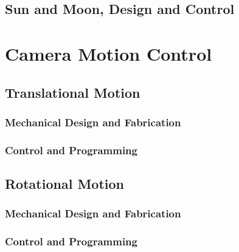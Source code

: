 \documentclass[]{report}
\begin{document}
	\chapter{Sun and Moon, Design and Control}

\part{Camera Motion Control}
	
	\chapter{Translational Motion}
		\section{Mechanical Design and Fabrication}
		\section{Control and Programming}
		
	\chapter{Rotational Motion}
		\section{Mechanical Design and Fabrication}
		\section{Control and Programming}
		
\end{document}
